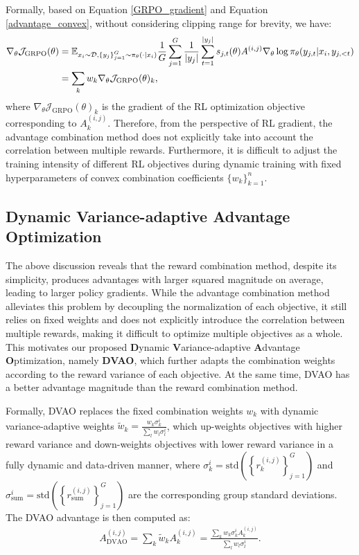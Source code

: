 Formally, based on Equation \ref{GRPO_gradient} and Equation \ref{advantage_convex}, without considering clipping range for brevity, we have:
\begin{align}
    \nabla_\theta \mathcal{J}_\text{GRPO}(\theta) &= \mathbb{E}_{x_i \sim \mathcal{D},\left\{y_j\right\}_{j=1}^G \sim \pi_\theta(\cdot | x_i)} \frac{1}{G} \sum_{j=1}^G \frac{1}{|y_j|} \sum_{t=1}^{|y_j|} s_{j,t}(\theta)A^{(i,j)} \nabla_\theta\log \pi_\theta (y_{j,t} | x_i, y_{j, <t}) \notag\\
    &= \sum_k w_k \nabla_\theta \mathcal{J}_\text{GRPO}(\theta)_k,
\end{align}
where $\nabla_\theta\mathcal{J}_\text{GRPO}(\theta)_k$ is the gradient of the RL optimization objective corresponding to $A_k^{(i,j)}$. Therefore, from the perspective of RL gradient, the advantage combination method does not explicitly take into account the correlation between multiple rewards. Furthermore, it is difficult to adjust the training intensity of different RL objectives during dynamic training with fixed hyperparameters of convex combination coefficients $\{w_k\}_{k=1}^n$.

\subsection{Dynamic Variance-adaptive Advantage Optimization}
The above discussion reveals that the reward combination method, despite its simplicity, produces advantages with larger squared magnitude on average, leading to larger policy gradients. While the advantage combination method alleviates this problem by decoupling the normalization of each objective, it still relies on fixed weights and does not explicitly introduce the correlation between multiple rewards, making it difficult to optimize multiple objectives as a whole. This motivates our proposed \textbf{D}ynamic \textbf{V}ariance-adaptive \textbf{A}dvantage \textbf{O}ptimization, namely \textbf{DVAO}, which further adapts the combination weights according to the reward variance of each objective. At the same time, DVAO has a better advantage magnitude than the reward combination method.

Formally, DVAO replaces the fixed combination weights $w_k$ with dynamic variance-adaptive weights $\tilde{w}_k = \frac{w_k\sigma_k^i}{\sum_l w_l \sigma_l^i}$, which up-weights objectives with higher reward variance and down-weights objectives with lower reward variance in a fully dynamic and data-driven manner, where $\sigma_k^i = \text{std} \left(\left\{ r_k^{(i,j)} \right\}_{j=1}^G\right)$ and $\sigma_\text{sum}^i = \text{std} \left(\left\{ r_\text{sum}^{(i,j)} \right\}_{j=1}^G\right)$ are the corresponding group standard deviations. The DVAO advantage is then computed as:
\begin{align}
    A_\text{DVAO}^{(i,j)} = \sum_k \tilde{w}_k A_k^{(i,j)} = \frac{\sum_k w_k \sigma_k^i A_k^{(i,j)}}{\sum_l w_l \sigma_l^i}. \label{DVAO}
\end{align}

